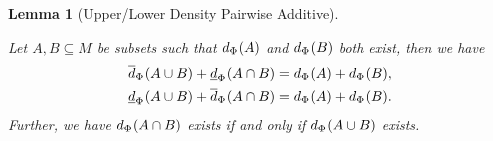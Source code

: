 \documentclass[
  british,
]{article}
\theoremstyle{plain}
\theoremstyle{plain}
\newtheorem{lemma}{Lemma}[section]
\theoremstyle{definition}
\theoremstyle{remark}
\newcommand{\Folner}[1][\vphantom{}]{{\Phi}_{#1}}
\newcommand{\Density}[2][\Folner]{d_{{#1}}({#2})}
\newcommand{\LowerDensity}[2][\Folner]{\underline{d}_{{#1}}({#2})}
\newcommand{\Monoid}{{M}}
\newcommand{\UpperDensity}[2][\Folner]{\overline{d}_{{#1}}({#2})}
\begin{document}
\begin{lemma}[Upper/Lower Density Pairwise
Additive]\protect\hypertarget{lem-DensityPairwiseAdditivity}{}\label{lem-DensityPairwiseAdditivity}

Let \(A,B\subseteq\Monoid\) be subsets such that \(\Density{A}\) and
\(\Density{B}\) both exist, then we have \begin{align*}
    \UpperDensity{A\cup B}+\LowerDensity{A\cap B}&=\Density{A}+\Density{B},
    \\\LowerDensity{A\cup B}+\UpperDensity{A\cap B}&=\Density{A}+\Density{B}.
\end{align*} Further, we have \(\Density{A\cap B}\) exists if and only
if \(\Density{A\cup B}\) exists.

\end{lemma}
\end{document}
